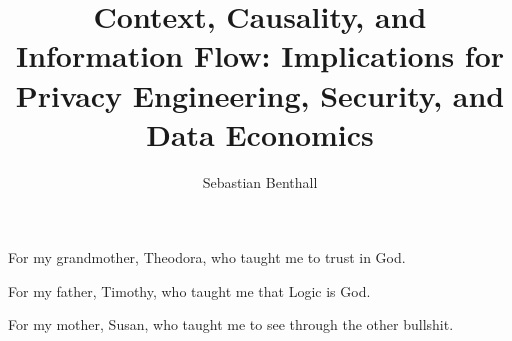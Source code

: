 \documentclass[12pt, oneside]{lib/ucthesis}
\begin{document}

\title{Context, Causality, and Information Flow: Implications for Privacy Engineering, Security, and Data Economics}
\author{Sebastian Benthall}

\prevdegrees{} %



	


\begin{frontmatter} 
\maketitle
\approvalpage
\copyrightpage
\abstract



\endabstract

\end{frontmatter}
\begin{optionalFrontMatter}
\begin{dedication}
	\vspace*{\fill} 
	For my grandmother, Theodora, who taught me to trust in God.

        For my father, Timothy, who taught me that Logic is God.

        For my mother, Susan, who taught me to see through the other bullshit.
	\vspace*{\fill} 
\end{dedication}
\end{optionalFrontMatter}
\end{document}
